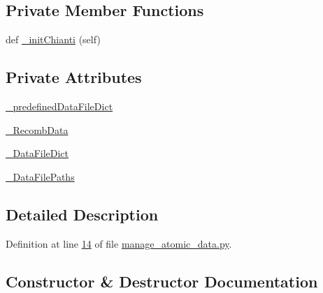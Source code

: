 \subsection*{Private Member Functions}
\begin{DoxyCompactItemize}
\item 
def \hyperlink{classpyneb_1_1utils_1_1manage__atomic__data_1_1___manage_atomic_data_a76dc32f396e494e06327a6c8464d005e}{\+\_\+init\+Chianti} (self)
\end{DoxyCompactItemize}
\subsection*{Private Attributes}
\begin{DoxyCompactItemize}
\item 
\hyperlink{classpyneb_1_1utils_1_1manage__atomic__data_1_1___manage_atomic_data_ad9b54bc077170e477f23059e2256b30f}{\+\_\+predefined\+Data\+File\+Dict}
\item 
\hyperlink{classpyneb_1_1utils_1_1manage__atomic__data_1_1___manage_atomic_data_a01eaf095b647e87d3dbf9094104f680c}{\+\_\+\+Recomb\+Data}
\item 
\hyperlink{classpyneb_1_1utils_1_1manage__atomic__data_1_1___manage_atomic_data_a25a8e0770b6d8a375cfc9092d600684d}{\+\_\+\+Data\+File\+Dict}
\item 
\hyperlink{classpyneb_1_1utils_1_1manage__atomic__data_1_1___manage_atomic_data_a92da10ed6b2395c54f88300c05a71ae9}{\+\_\+\+Data\+File\+Paths}
\end{DoxyCompactItemize}


\subsection{Detailed Description}


Definition at line \hyperlink{manage__atomic__data_8py_source_l00014}{14} of file \hyperlink{manage__atomic__data_8py_source}{manage\+\_\+atomic\+\_\+data.\+py}.



\subsection{Constructor \& Destructor Documentation}
\hypertarget{classpyneb_1_1utils_1_1manage__atomic__data_1_1___manage_atomic_data_a5cadf1550d771a79538a0a6a58a4cd59}{}
